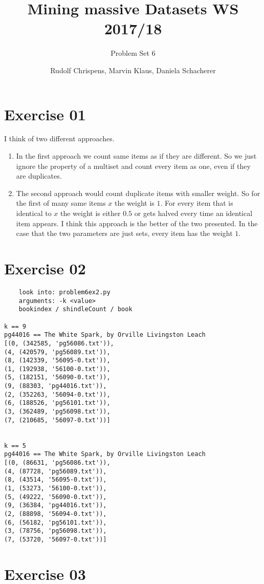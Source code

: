 \documentclass[11pt,a4paper]{scrartcl}
\title{Mining massive Datasets WS 2017/18}
\subtitle{Problem Set 6}
\author{Rudolf Chrispens, Marvin Klaus, Daniela Schacherer}
\begin{document}
\maketitle

\section*{Exercise 01}

I think of two different approaches.
\begin{enumerate}
\item In the first approach we count same items as if they are different. So we just ignore the property of a multiset and count every item as one, even if they are duplicates.
\item The second approach would count duplicate items with smaller weight. So for the first of many same items $x$ the weight is $1$. For every item that is identical to $x$ the weight is either $0.5$ or gets halved every time an identical item appears. I think this approach is the better of the two presented. In the case that the two parameters are just sets, every item has the weight $1$.
\end{enumerate}

\section*{Exercise 02}
\begin{verbatim}
	look into: problem6ex2.py
	arguments: -k <value>
	bookindex / shindleCount / book
	
k == 9
pg44016 == The White Spark, by Orville Livingston Leach
[(0, (342585, 'pg56086.txt')),
(4, (420579, 'pg56089.txt')),
(8, (142339, '56095-0.txt')), 
(1, (192938, '56100-0.txt')),
(5, (182151, '56090-0.txt')),
(9, (88303, 'pg44016.txt')),
(2, (352263, '56094-0.txt')),
(6, (188526, 'pg56101.txt')),
(3, (362489, 'pg56098.txt')),
(7, (210685, '56097-0.txt'))]


k == 5
pg44016 == The White Spark, by Orville Livingston Leach
[(0, (86631, 'pg56086.txt')), 
(4, (87728, 'pg56089.txt')), 
(8, (43514, '56095-0.txt')), 
(1, (53273, '56100-0.txt')), 
(5, (49222, '56090-0.txt')), 
(9, (36384, 'pg44016.txt')), 
(2, (88898, '56094-0.txt')), 
(6, (56182, 'pg56101.txt')), 
(3, (78756, 'pg56098.txt')), 
(7, (53720, '56097-0.txt'))]

\end{verbatim}
\section*{Exercise 03}
\end{document}
